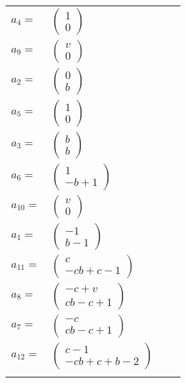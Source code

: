 \documentclass[1p]{elsarticle_modified}
\theoremstyle{definition}
\begin{document}
\begin{tabular}{m{7pt} m{180pt} m{7pt} m{180pt} }
\flushright $a_{4}=$&$\begin{pmatrix}1\\0\end{pmatrix}$ \\
\flushright $a_{9}=$&$\begin{pmatrix}v\\0\end{pmatrix}$ \\
\flushright $a_{2}=$&$\begin{pmatrix}0\\b\end{pmatrix}$ \\
\flushright $a_{5}=$&$\begin{pmatrix}1\\0\end{pmatrix}$ \\
\flushright $a_{3}=$&$\begin{pmatrix}b\\b\end{pmatrix}$ \\
\flushright $a_{6}=$&$\begin{pmatrix}1\\- b+1\end{pmatrix}$ \\
\flushright $a_{10}=$&$\begin{pmatrix}v\\0\end{pmatrix}$ \\
\flushright $a_{1}=$&$\begin{pmatrix}-1\\b-1\end{pmatrix}$ \\
\flushright $a_{11}=$&$\begin{pmatrix}c\\- c b+c-1\end{pmatrix}$ \\
\flushright $a_{8}=$&$\begin{pmatrix}- c+v\\c b- c+1\end{pmatrix}$ \\
\flushright $a_{7}=$&$\begin{pmatrix}- c\\c b- c+1\end{pmatrix}$ \\
\flushright $a_{12}=$&$\begin{pmatrix}c-1\\- c b+c+b-2\end{pmatrix}$\\&\end{tabular}
\end{document}
